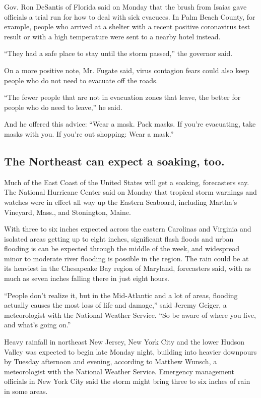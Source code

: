Gov. Ron DeSantis of Florida said on Monday that the brush from Isaias
gave officials a trial run for how to deal with sick evacuees. In Palm
Beach County, for example, people who arrived at a shelter with a recent
positive coronavirus test result or with a high temperature were sent to
a nearby hotel instead.

``They had a safe place to stay until the storm passed,'' the governor
said.

On a more positive note, Mr. Fugate said, virus contagion fears could
also keep people who do not need to evacuate off the roads.

``The fewer people that are not in evacuation zones that leave, the
better for people who do need to leave,'' he said.

And he offered this advice: ``Wear a mask. Pack masks. If you're
evacuating, take masks with you. If you're out shopping: Wear a mask.''

\hypertarget{the-northeast-can-expect-a-soaking-too}{%
\subsection{The Northeast can expect a soaking,
too.}\label{the-northeast-can-expect-a-soaking-too}}

Much of the East Coast of the United States will get a soaking,
forecasters say. The National Hurricane Center said on Monday that
tropical storm warnings and watches were in effect all way up the
Eastern Seaboard, including Martha's Vineyard, Mass., and Stonington,
Maine.

With three to six inches expected across the eastern Carolinas and
Virginia and isolated areas getting up to eight inches, significant
flash floods and urban flooding is can be expected through the middle of
the week, and widespread minor to moderate river flooding is possible in
the region. The rain could be at its heaviest in the Chesapeake Bay
region of Maryland, forecasters said, with as much as seven inches
falling there in just eight hours.

``People don't realize it, but in the Mid-Atlantic and a lot of areas,
flooding actually causes the most loss of life and damage,'' said Jeremy
Geiger, a meteorologist with the National Weather Service. ``So be aware
of where you live, and what's going on.''

Heavy rainfall in northeast New Jersey, New York City and the lower
Hudson Valley was expected to begin late Monday night, building into
heavier downpours by Tuesday afternoon and evening, according to Matthew
Wunsch, a meteorologist with the National Weather Service. Emergency
management officials in New York City said the storm might bring three
to six inches of rain in some areas.

